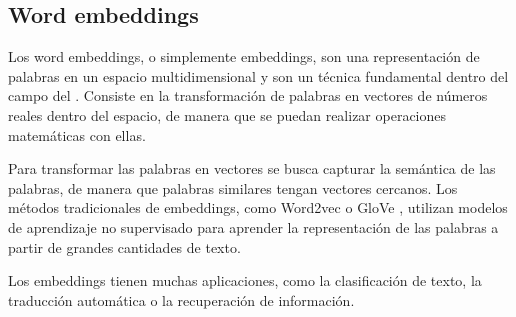 \subsection{Word embeddings}
Los word embeddings, o simplemente embeddings, son una representación de palabras en un espacio multidimensional y son un técnica fundamental dentro del campo del . Consiste en la transformación de palabras en vectores de números reales dentro del espacio, de manera que se puedan realizar operaciones matemáticas con ellas.

Para transformar las palabras en vectores se busca capturar la semántica de las palabras, de manera que palabras similares tengan vectores cercanos. Los métodos tradicionales de embeddings, como Word2vec \cite{mikolov2013efficient} o GloVe \cite{pennington2014glove}, utilizan modelos de aprendizaje no supervisado para aprender la representación de las palabras a partir de grandes cantidades de texto.

Los embeddings tienen muchas aplicaciones, como la clasificación de texto, la traducción automática o la recuperación de información.